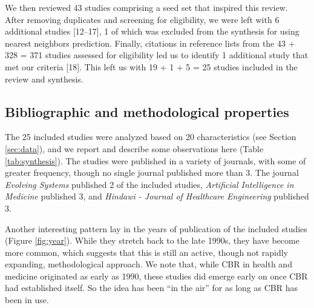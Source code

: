 \documentclass[preprint, 3p,
authoryear]{elsarticle} %
\begin{document}
We then reviewed 43 studies comprising a seed set that inspired this
review. After removing duplicates and screening for eligibility, we were
left with 6 additional studies {[}12--17{]}, 1 of which was excluded
from the synthesis for using nearest neighbors prediction. Finally,
citations in reference lists from the 43 + 328 = 371 studies assessed
for eligibility led us to identify 1 additional study that met our
criteria {[}18{]}. This left us with 19 + 1 + 5 = 25 studies included in
the review and synthesis.

\hypertarget{bibliographic-and-methodological-properties}{%
\subsection{Bibliographic and methodological
properties}\label{bibliographic-and-methodological-properties}}

The 25 included studies were analyzed based on 20 characteristics (see
Section \ref{sec:data}), and we report and describe some observations
here (Table \ref{tab:synthesis}). The studies were published in a
variety of journals, with some of greater frequency, though no single
journal published more than 3. The journal \emph{Evolving Systems}
published 2 of the included studies, \emph{Artificial Intelligence in
Medicine} published 3, and \emph{Hindawi - Journal of Healthcare
Engineering} published 3.

Another interesting pattern lay in the years of publication of the
included studies (Figure \ref{fig:year}). While they stretch back to the
late 1990s, they have become more common, which suggests that this is
still an active, though not rapidly expanding, methodological approach.
We note that, while CBR in health and medicine originated as early as
1990, these studies did emerge early on once CBR had established itself.
So the idea has been ``in the air'' for as long as CBR has been in use.
\end{document}
